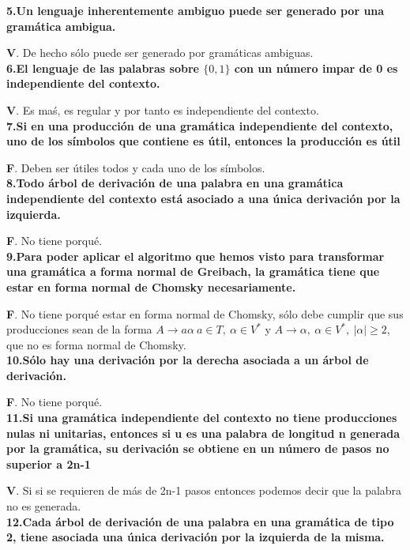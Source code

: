 \documentclass[a4paper,11pt]{article}
\begin{document}
\textbf{5.Un lenguaje inherentemente ambiguo puede ser generado por una gramática ambigua.}

\textbf{V}. De hecho sólo puede ser generado por gramáticas ambiguas. \\

\textbf{6.El lenguaje de las palabras sobre $\{0,1\}$ con un número impar de 0 es independiente del contexto.}

\textbf{V}. Es maś, es regular y por tanto es independiente del contexto. \\

\textbf{7.Si en una producción de una gramática independiente del contexto, uno de los símbolos que contiene es útil, entonces la producción es útil}

\textbf{F}. Deben ser útiles todos y cada uno de los símbolos. \\

\textbf{8.Todo árbol de derivación de una palabra en una gramática independiente del contexto está asociado a una única derivación por la izquierda.}

\textbf{F}. No tiene porqué. \\

\textbf{9.Para poder aplicar el algoritmo que hemos visto para transformar una gramática a forma normal de Greibach, la gramática tiene que estar en forma normal de Chomsky necesariamente.}

\textbf{F}. No tiene porqué estar en forma normal de Chomsky, sólo debe cumplir que sus producciones sean de la forma $A \rightarrow a\alpha \> a \in T, \> \alpha\in V^*$ y $A \rightarrow \alpha, \> \alpha \in V^*, \> |\alpha|\geq 2$, que no es forma normal de Chomsky. \\

\textbf{10.Sólo hay una derivación por la derecha asociada a un árbol de derivación.}

\textbf{F}. No tiene porqué.\\

\textbf{11.Si una gramática independiente del contexto no tiene producciones nulas ni unitarias, entonces si u es una palabra de longitud n generada por la gramática, su derivación se obtiene en un número de pasos no superior a 2n-1}

\textbf{V}. Si si se requieren de más de 2n-1 pasos entonces podemos decir que la palabra no es generada. \\

\textbf{12.Cada árbol de derivación de una palabra en una gramática de tipo 2, tiene asociada una única derivación por la izquierda de la misma.}
\end{document}
